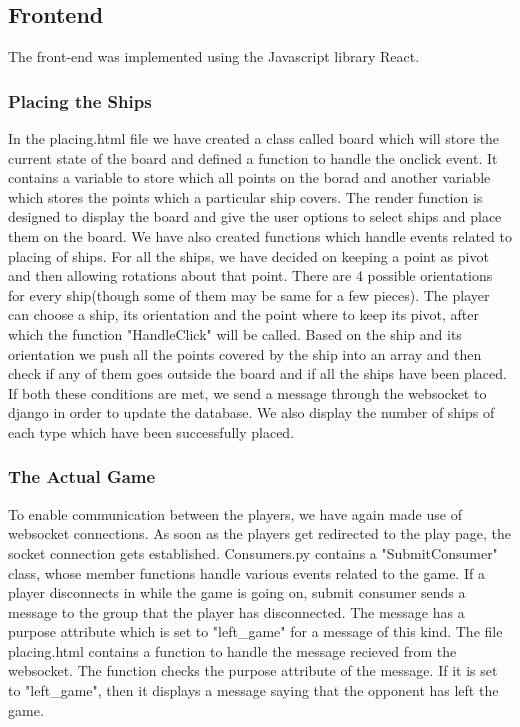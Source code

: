 \documentclass[titlepage]{article}
\begin{document}
\subsection{Frontend}
The front-end was implemented using the Javascript library React.
\subsubsection{Placing the Ships}
In the placing.html file we have created a class called board which will store the current state of the board and defined a function to handle the onclick event. It contains a variable to store which all points on the borad and another variable which stores the points which a particular ship covers. The render function is designed to display the board and give the user options to select ships and place them on the board. We have also created functions which handle events related to placing of ships. For all the ships, we have decided on keeping a point as pivot and then allowing rotations about that point. There are 4 possible orientations for every ship(though some of them may be same for a few pieces). The player can choose a ship, its orientation and the point where to keep its pivot, after which the function "HandleClick" will be called. Based on the ship and its orientation we push all the points covered by the ship into an array and then check if any of them goes outside the board and if all the ships have been placed. If both these conditions are met, we send a message through the websocket to django in order to update the database. We also display the number of ships of each type which have been successfully placed.

\subsubsection{The Actual Game}
To enable communication between the players, we have again made use of websocket connections. As soon as the players get redirected to the play page, the socket connection gets established. Consumers.py contains a "SubmitConsumer" class, whose member functions handle various events related to the game. If a player disconnects in while the game is going on, submit consumer sends a message to the group that the player has disconnected. The message has a purpose attribute which is set to "left\_game" for a message of this kind. The file placing.html contains a function to handle the message recieved from the websocket. The function checks the purpose attribute of the message. If it is set to "left\_game", then it displays a message saying that the opponent has left the game.
\end{document}
